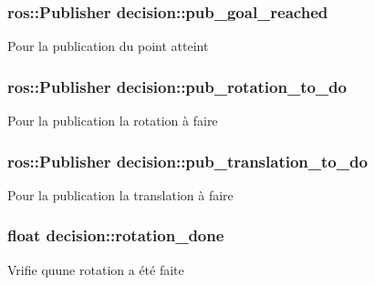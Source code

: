 \subsubsection[{\texorpdfstring{pub\+\_\+goal\+\_\+reached}{pub_goal_reached}}]{\setlength{\rightskip}{0pt plus 5cm}ros\+::\+Publisher decision\+::pub\+\_\+goal\+\_\+reached\hspace{0.3cm}{\ttfamily [private]}}\hypertarget{classdecision_ae19f3ccf052d2d7fa227038ee1f5b188}{}\label{classdecision_ae19f3ccf052d2d7fa227038ee1f5b188}
Pour la publication du point atteint 
\subsubsection[{\texorpdfstring{pub\+\_\+rotation\+\_\+to\+\_\+do}{pub_rotation_to_do}}]{\setlength{\rightskip}{0pt plus 5cm}ros\+::\+Publisher decision\+::pub\+\_\+rotation\+\_\+to\+\_\+do\hspace{0.3cm}{\ttfamily [private]}}\hypertarget{classdecision_ad558fa4353559c47a042cd6619c8d2a7}{}\label{classdecision_ad558fa4353559c47a042cd6619c8d2a7}
Pour la publication la rotation à faire 
\subsubsection[{\texorpdfstring{pub\+\_\+translation\+\_\+to\+\_\+do}{pub_translation_to_do}}]{\setlength{\rightskip}{0pt plus 5cm}ros\+::\+Publisher decision\+::pub\+\_\+translation\+\_\+to\+\_\+do\hspace{0.3cm}{\ttfamily [private]}}\hypertarget{classdecision_af74b71a091485c829679882417c113d5}{}\label{classdecision_af74b71a091485c829679882417c113d5}
Pour la publication la translation à faire 
\subsubsection[{\texorpdfstring{rotation\+\_\+done}{rotation_done}}]{\setlength{\rightskip}{0pt plus 5cm}float decision\+::rotation\+\_\+done\hspace{0.3cm}{\ttfamily [private]}}\hypertarget{classdecision_afbccffed34269bd18f004232facbced2}{}\label{classdecision_afbccffed34269bd18f004232facbced2}
Vrifie qu\textquotesingle{}une rotation a été faite 
